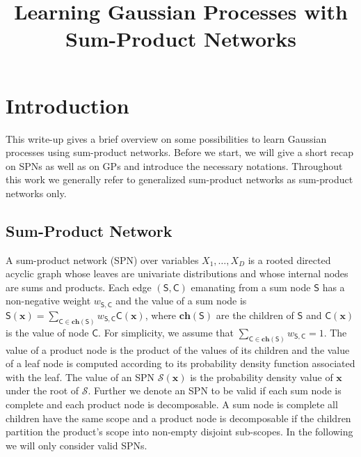 \documentclass[10pt,letterpaper]{article}
\newcommand{\SPN}{\mathcal{S}}
\newcommand{\x}{\mathbf{x}}
\newcommand{\SumNode}{\mathsf{S}}
\newcommand{\Child}{\mathsf{C}}
\newcommand{\ch}{\ensuremath{\mathbf{ch}}}
\newcommand{\w}{w}
\theoremstyle{mystyle}
\begin{document}
\title{Learning Gaussian Processes with Sum-Product Networks}


\author{}


\maketitle
\section{Introduction}
This write-up gives a brief overview on some possibilities to learn Gaussian processes using sum-product networks.
Before we start, we will give a short recap on SPNs as well as on GPs and introduce the necessary notations. Throughout this work we generally refer to generalized sum-product networks as sum-product networks only.

\subsection{Sum-Product Network}
\label{sec:spns}
A sum-product network (SPN) over variables $X_1, \dots, X_D$ is a rooted directed acyclic graph whose leaves are univariate distributions and whose internal nodes are sums and products. Each edge $(\SumNode,\Child)$ emanating from a sum node $\SumNode$ has a non-negative weight $\w_{\SumNode,\Child}$ and the value of a sum node is $\SumNode(\x) = \sum_{\Child \in \ch(\SumNode)} \w_{\SumNode,\Child} \Child(\x)$, where $\ch(\SumNode)$ are the children of $\SumNode$ and $\Child(\x)$ is the value of node $\Child$. For simplicity, we assume that $\sum_{\Child \in \ch(\SumNode)} \w_{\SumNode,\Child} = 1$. The value of a product node is the product of the values of its children and the value of a leaf node is computed according to its probability density function associated with the leaf. The value of an SPN $\SPN(\x)$ is the probability density value of $\x$ under the root of $\SPN$.
Further we denote an SPN to be valid if each sum node is complete and each product node is decomposable.
A sum node is complete all children have the same scope and a product node is decomposable if the children partition the product's scope into non-empty disjoint sub-scopes.
In the following we will only consider valid SPNs.
\end{document}
